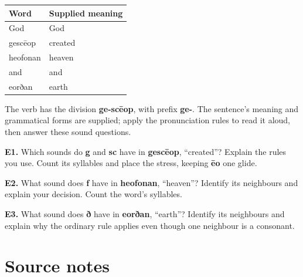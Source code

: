 \par\begingroup
\fontsize{10.5}{13.2}\selectfont
\setlength{\LTleft}{0pt}\setlength{\LTright}{\fill}
\noindent
\begin{tabular}{@{}>{\raggedright\arraybackslash}p{56.106mm}>{\raggedright\arraybackslash}p{65.082mm}@{}}
\toprule
\textbf{Word} & \textbf{Supplied meaning} \\
\midrule
God & God \\
gescēop & created \\
heofonan & heaven \\
and & and \\
eorðan & earth \\
\bottomrule
\end{tabular}
\par\endgroup

The verb has the division \textbf{ge-scēop}, with prefix \textbf{ge-}. The sentence's meaning and grammatical forms are supplied; apply the pronunciation rules to read it aloud, then answer these sound questions.

\textbf{E1.} Which sounds do \textbf{g} and \textbf{sc} have in \textbf{gescēop}, “created”? Explain the rules you use. Count its syllables and place the stress, keeping \textbf{ēo} one glide.

\textbf{E2.} What sound does \textbf{f} have in \textbf{heofonan}, “heaven”? Identify its neighbours and explain your decision. Count the word's syllables.

\textbf{E3.} What sound does \textbf{ð} have in \textbf{eorðan}, “earth”? Identify its neighbours and explain why the ordinary rule applies even though one neighbour is a consonant.

\section*{Source notes}


